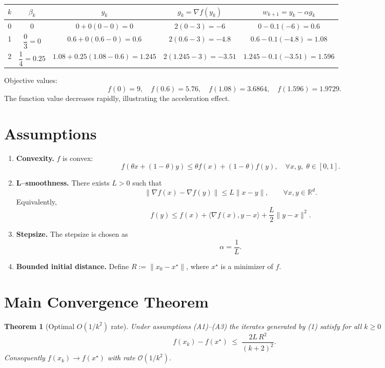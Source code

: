 \documentclass{article}
\newtheorem{theorem}{Theorem}
\newcommand{\grad}{\nabla}
\begin{document}
\begin{center}
\begin{tabular}{c|c|c|c|c}
$k$ & $\beta_k$ & $y_k$ & $g_k=\grad f(y_k)$ & $w_{k+1}=y_k-\alpha g_k$ \\ \hline
0 & $0$ & $0+0(0-0)=0$ & $2(0-3)=-6$ & $0-0.1(-6)=0.6$ \\[2mm]
1 & $\dfrac{0}{3}=0$ & $0.6+0(0.6-0)=0.6$ & $2(0.6-3)=-4.8$ & $0.6-0.1(-4.8)=1.08$ \\[2mm]
2 & $\dfrac{1}{4}=0.25$ & $1.08+0.25(1.08-0.6)=1.245$ & $2(1.245-3)=-3.51$ & $1.245-0.1(-3.51)=1.596$ 
\end{tabular}
\end{center}
Objective values:
\[
f(0)=9,\quad f(0.6)=5.76,\quad f(1.08)=3.6864,\quad f(1.596)=1.9729.
\]
The function value decreases rapidly, illustrating the acceleration effect.

\section*{Assumptions}
\begin{enumerate}
\item \textbf{Convexity.} $f$ is convex:
\[
f(\theta x+(1-\theta)y)\le \theta f(x)+(1-\theta)f(y),\quad\forall x,y,\;\theta\in[0,1].
\tag{A1}
\]
\item \textbf{L–smoothness.} There exists $L>0$ such that
\[
\|\grad f(x)-\grad f(y)\|\le L\|x-y\|,\qquad\forall x,y\in\mathbb{R}^d.
\tag{A2}
\]
Equivalently,
\[
f(y)\le f(x)+\langle\grad f(x),y-x\rangle+\frac{L}{2}\|y-x\|^{2}.
\tag{A2'}
\]
\item \textbf{Stepsize.} The stepsize is chosen as 
\[
\alpha =\frac{1}{L}.
\tag{A3}
\]
\item \textbf{Bounded initial distance.} Define $R:=\|x_{0}-x^{\star}\|$, where $x^{\star}$ is a minimizer of $f$.
\end{enumerate}

\section*{Main Convergence Theorem}
\begin{theorem}[Optimal $O(1/k^{2})$ rate]
\label{thm:main}
Under assumptions (A1)–(A3) the iterates generated by (1) satisfy for all $k\ge 0$
\[
f(x_{k})-f(x^{\star})\;\le\;\frac{2L\,R^{2}}{(k+2)^{2}}.
\tag{T1}
\]
Consequently $f(x_{k})\to f(x^{\star})$ with rate $\mathcal{O}(1/k^{2})$.
\end{theorem}
\end{document}
